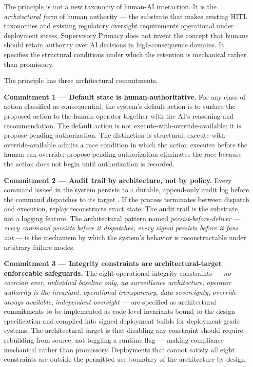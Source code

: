 The principle is not a new taxonomy of human-AI interaction. It is the
\emph{architectural form} of human authority --- the substrate that
makes existing HITL taxonomies and existing regulatory oversight
requirements operational under deployment stress. Supervisory Primacy
does not invent the concept that humans should retain authority over AI
decisions in high-consequence domains. It specifies the structural
conditions under which the retention is mechanical rather than
promissory.

The principle has three architectural commitments.

\textbf{Commitment 1 --- Default state is human-authoritative.} For any
class of action classified as consequential, the system's default action
is to surface the proposed action to the human operator together with
the AI's reasoning and recommendation. The default action is not
execute-with-override-available; it is propose-pending-authorization.
The distinction is structural: execute-with-override-available admits a
race condition in which the action executes before the human can
override; propose-pending-authorization eliminates the race because the
action does not begin until authorization is recorded.

\textbf{Commitment 2 --- Audit trail by architecture, not by policy.}
Every command issued in the system persists to a durable, append-only
audit log before the command dispatches to its target \cite{ref3}. If the
process terminates between dispatch and execution, replay reconstructs
exact state. The audit trail is the substrate, not a logging feature.
The architectural pattern named \emph{persist-before-deliver} ---
\emph{every command persists before it dispatches; every signal persists
before it fans out} --- is the mechanism by which the system's behavior
is reconstructable under arbitrary failure modes.

\textbf{Commitment 3 --- Integrity constraints are architectural-target
enforceable safeguards.} The eight operational integrity constraints ---
\emph{no coercion ever}, \emph{individual baseline only}, \emph{no
surveillance architecture}, \emph{operator authority is the invariant},
\emph{operational transparency}, \emph{data sovereignty}, \emph{override
always available}, \emph{independent oversight} \cite{ref4} --- are
specified as architectural commitments to be implemented as code-level
invariants bound to the design specification and compiled into signed
deployment builds for deployment-grade systems. The architectural target
is that disabling any constraint should require rebuilding from source,
not toggling a runtime flag --- making compliance mechanical rather than
promissory. Deployments that cannot satisfy all eight constraints are
outside the permitted use boundary of the architecture by design.

